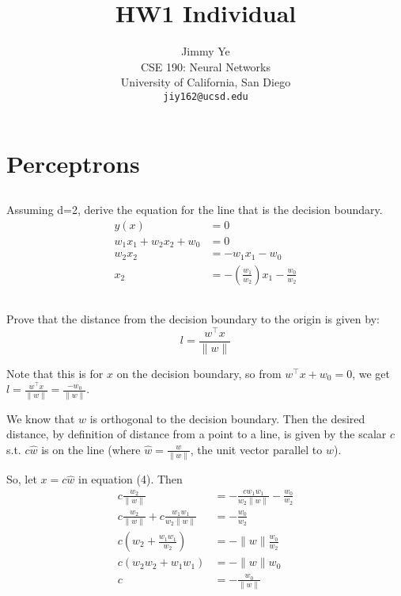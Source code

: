 \documentclass{article} %
\title{HW1 Individual}
\author{
  Jimmy Ye\\
  CSE 190: Neural Networks\\
  University of California, San Diego\\
  \texttt{jiy162@ucsd.edu} \\
}
\begin{document}
\maketitle

\section{Perceptrons}

\subsection{}

Assuming d=2, derive the equation for the line that is the decision boundary.
%
\begin{align}
  y(x) &= 0\\
  w_1x_1 + w_2x_2 + w_0 &= 0\\
  w_2x_2 &= -w_1x_1 - w_0\\
  x_2 &= -(\frac{w_1}{w_2})x_1 - \frac{w_0}{w_2}
\end{align}


\subsection{}

Prove that the distance from the decision boundary to the origin is given by:
%
\[l = \frac{w^\top x}{\lVert w \rVert}\]

Note that this is for $x$ on the decision boundary, so from $w^\top x + w_0 = 0$, we
get $l = \frac{w^\top x}{\lVert w \rVert} = \frac{-w_0}{\lVert w \rVert}$.

We know that $w$ is orthogonal to the decision boundary. Then the desired
distance, by definition of distance from a point to a line, is given by the
scalar $c$ s.t. $c \hat{w}$ is on the line (where
$\hat{w}=\frac{w}{\lVert w \rVert}$, the unit vector parallel to $w$).

So, let $x = c \hat{w}$ in equation (4). Then
\begin{align}
  c \frac{w_2}{\lVert w \rVert} &= -\frac{cw_1w_1}{w_2\lVert w \rVert} - \frac{w_0}{w_2}\\
  c \frac{w_2}{\lVert w \rVert} + c\frac{w_1w_1}{w_2\lVert w \rVert} &= - \frac{w_0}{w_2}\\
  c (w_2 + \frac{w_1w_1}{w_2}) &= - \lVert w \rVert \frac{w_0}{w_2}\\
  c (w_2w_2 + w_1w_1) &= - \lVert w \rVert w_0\\
  c &= - \frac{w_0}{\lVert w \rVert}
\end{align}
\end{document}
